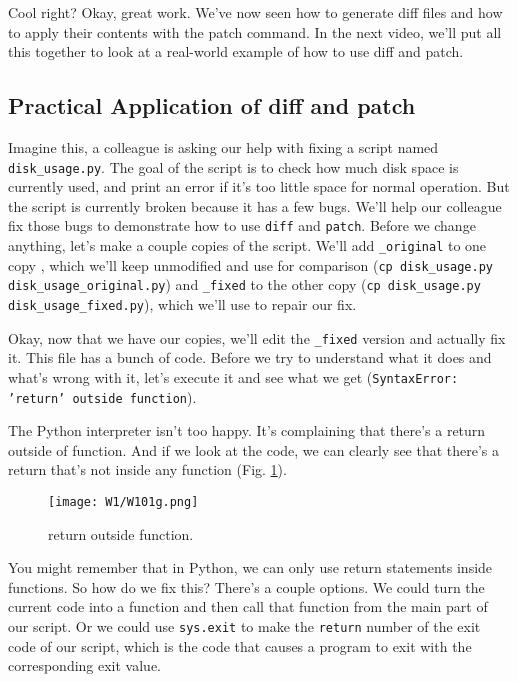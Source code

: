 	Cool right? Okay, great work. We've now seen how to generate diff files and how to apply their contents with the patch command. In the next video, we'll put all this together to look at a real-world example of how to use diff and patch.
	
	\subsection{Practical Application of diff and patch}
		
	Imagine this, a colleague is asking our help with fixing a script named \verb|disk_usage.py|. The goal of the script is to check how much disk space is currently used, and print an error if it's too little space for normal operation. But the script is currently broken because it has a few bugs. We’ll help our colleague fix those bugs to demonstrate how to use \texttt{diff} and \texttt{patch}. Before we change anything, let’s make a couple copies of the script. We'll add \verb|_original| to one copy , which we’ll keep unmodified and use for comparison (\verb|cp disk_usage.py disk_usage_original.py|) and \verb|_fixed| to the other copy (\verb|cp disk_usage.py disk_usage_fixed.py|), which we’ll use to repair our fix.
	
	Okay, now that we have our copies, we'll edit the \verb|_fixed| version and actually fix it. This file has a bunch of code. Before we try to understand what it does and what's wrong with it, let's execute it and see what we get (\texttt{SyntaxError: 'return' outside function}).
	
	
	The Python interpreter isn't too happy. It's complaining that there's a return outside of function. And if we look at the code, we can clearly see that there's a return that's not inside any function (Fig. \ref{W101g}).
	
	\begin{figure} 
		\caption{return outside function.}
		\centering
		\texttt{[image: W1/W101g.png]}
		\label{W101g}
	\end{figure}
	
	You might remember that in Python, we can only use return statements inside functions. So how do we fix this? There's a couple options. We could turn the current code into a function and then call that function from the main part of our script. Or we could use \verb|sys.exit| to make the \texttt{return} number of the exit code of our script, which is the code that causes a program to exit with the corresponding exit value. 
	
